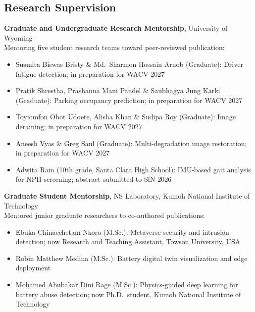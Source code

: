 \documentclass[11pt, letterpaper]{article}
\newcommand{\entry}[2]{%
  \begin{list}{}{%
    \setlength{\leftmargin}{0.17\linewidth}%
    \setlength{\labelwidth}{0.15\linewidth}%
    \setlength{\labelsep}{0.02\linewidth}%
    \setlength{\topsep}{3pt}%
    \setlength{\parsep}{2pt}%
    \setlength{\itemsep}{0pt}%
    \renewcommand{\makelabel}[1]{\parbox[t]{0.15\linewidth}{\small\raggedright\color{uwred}##1}\hfill}%
  }%
  \item[{#1}] #2%
  \end{list}%
}
\newcommand{\role}[1]{{\color{uwred}\textbf{#1}}}
\begin{document}
\subsection*{Research Supervision}

\entry{Mar 2026 --\\Present}{%
  \role{Graduate and Undergraduate Research Mentorship}, University of Wyoming\\
  Mentoring five student research teams toward peer-reviewed publication:
  \begin{itemize}
    \item Susmita Biswas Bristy \& Md.\ Sharmon Hossain Arnob (Graduate): Driver fatigue detection; in preparation for WACV 2027
    \item Pratik Shrestha, Prashanna Mani Paudel \& Saubhagya Jung Karki (Graduate): Parking occupancy prediction; in preparation for WACV 2027
    \item Toyiomfon Obot Udoete, Alisha Khan \& Sudipa Roy (Graduate): Image deraining; in preparation for WACV 2027
    \item Aneesh Vyas \& Greg Saul (Graduate): Multi-degradation image restoration; in preparation for WACV 2027
    \item Adwita Ram (10th grade, Santa Clara High School): IMU-based gait analysis for NPH screening; abstract submitted to SfN 2026
  \end{itemize}
}

\entry{2022 --\\2025}{%
  \role{Graduate Student Mentorship}, NS Laboratory, Kumoh National Institute of Technology\\
  Mentored junior graduate researchers to co-authored publications:
  \begin{itemize}
    \item Ebuka Chinaechetam Nkoro (M.Sc.): Metaverse security and intrusion detection; now Research and Teaching Assistant, Towson University, USA
    \item Robin Matthew Medina (M.Sc.): Battery digital twin visualization and edge deployment
    \item Mohamed Abubakar Dini Rage (M.Sc.): Physics-guided deep learning for battery abuse detection; now Ph.D.\ student, Kumoh National Institute of Technology
  \end{itemize}
}
\end{document}

